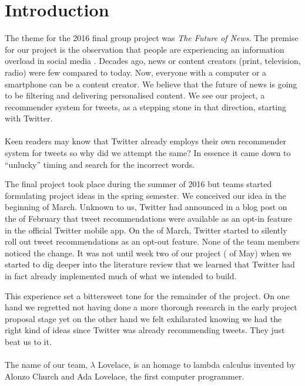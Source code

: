 \documentclass{article}
\begin{document}
\section{Introduction} %
The theme for the 2016 final group project was \textit{The Future of News}. The premise for our project is the observation that people are experiencing an information overload in social media \cite{information_overload}. Decades ago, news or content creators (print, television, radio) were few compared to today. Now, everyone with a computer or a smartphone can be a content creator. We believe that the future of news is going to be filtering and delivering personalised content. We see our project, a recommender system for tweets, as a stepping stone in that direction, starting with Twitter.
\\\\
Keen readers may know that Twitter already employs their own recommender system for tweets so why did we attempt the same? In essence it came down to ``unlucky'' timing and search for the incorrect words. 

The final project took place during the summer of 2016 but teams started formulating project ideas in the spring semester. We conceived our idea in the beginning of March. Unknown to us, Twitter had announced in a blog post \cite{twitter-opt-in} on the  of February that tweet recommendations were available as an opt-in feature in the official Twitter mobile app. On the  of March, Twitter started to silently roll out tweet recommendations as an opt-out feature. None of the team members noticed the change. It was not until week two of our project ( of May) when we started to dig deeper into the literature review that we learned that Twitter had in fact already implemented much of what we intended to build.

This experience set a bittersweet tone for the remainder of the project. On one hand we regretted not having done a more thorough research in the early project proposal stage yet on the other hand we felt exhilarated knowing we had the right kind of ideas since Twitter was already recommending tweets. They just beat us to it.
\\\\
The name of our team, $\lambda$ Lovelace, is an homage to lambda calculus invented by Alonzo Church and Ada Lovelace, the first computer programmer.

\vspace{2em}
\end{document}
